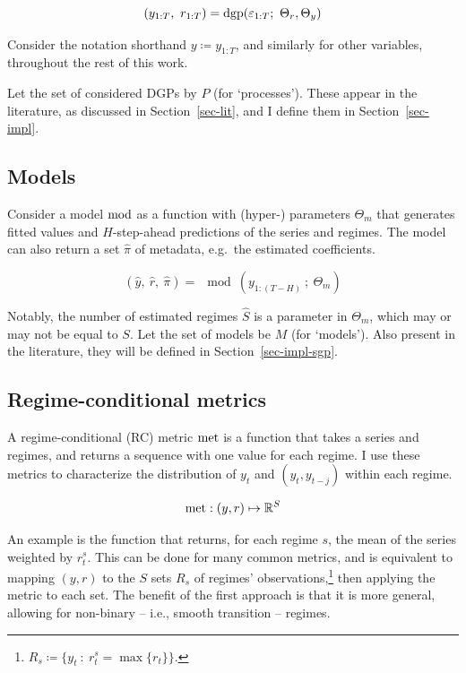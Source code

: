 \documentclass[
  letterpaper,
  DIV=11,
  numbers=noendperiod]{scrartcl}
\numberwithin{equation}{section}
\numberwithin{table}{section}
\numberwithin{figure}{section}
\begin{document}
\begin{equation}
    (y_{1:T},~ r_{1:T}) = \dgp(\varepsilon_{1:T};~ \Theta_r, \Theta_y)
\end{equation}

Consider the notation shorthand \(y \coloneqq y_{1:T}\), and similarly
for other variables, throughout the rest of this work.

Let the set of considered DGPs by \(P\) (for `processes'). These appear
in the literature, as discussed in Section~\ref{sec-lit}, and I define
them in Section~\ref{sec-impl}.

\subsection{Models}\label{sec-theory-models}

Consider a model \(\mod\) as a function with (hyper-) parameters
\(\Theta_m\) that generates fitted values and \(H\)-step-ahead
predictions of the series and regimes. The model can also return a set
\(\hat{\pi}\) of metadata, e.g.~the estimated coefficients.

\begin{equation}
    (\hat{y},~ \hat{r},~ \hat{\pi}) = \mod(y_{1:(T-H)} ~;~ \Theta_m)
\end{equation}

Notably, the number of estimated regimes \(\hat{S}\) is a parameter in
\(\Theta_m\), which may or may not be equal to \(S\). Let the set of
models be \(M\) (for `models'). Also present in the literature, they
will be defined in Section~\ref{sec-impl-sgp}.

\subsection{Regime-conditional metrics}\label{sec-theory-metrics}

A regime-conditional (RC) metric \(\met\) is a function that takes a
series and regimes, and returns a sequence with one value for each
regime. I use these metrics to characterize the distribution of \(y_t\)
and \((y_t, y_{t-j})\) within each regime.

\begin{equation}
    \met: (y, r) \mapsto \mathbb{R}^{S}
\end{equation}

An example is the function that returns, for each regime \(s\), the mean
of the series weighted by \(r^s_t\). This can be done for many common
metrics, and is equivalent to mapping \((y, r)\) to the \(S\) sets
\(R_s\) of regimes' observations,\footnote{\(R_s \coloneqq \{ y_t ~:~ r^s_t = \max\{r_t\} \}\).}
then applying the metric to each set. The benefit of the first approach
is that it is more general, allowing for non-binary -- i.e., smooth
transition -- regimes.
\end{document}
